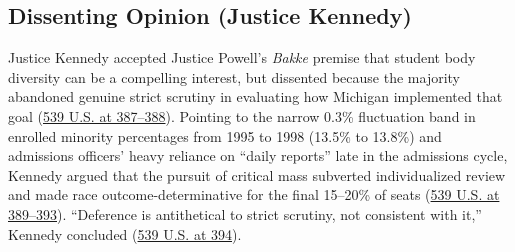 \documentclass[12pt]{article}
\begin{document}
\subsection{Dissenting Opinion (Justice Kennedy)}
Justice Kennedy accepted Justice Powell's \textit{Bakke} premise that student body diversity can be a compelling interest, but dissented because the majority abandoned genuine strict scrutiny in evaluating how Michigan implemented that goal (\href{https://supreme.justia.com/cases/federal/us/539/306/}{539 U.S. at 387--388}). Pointing to the narrow 0.3\% fluctuation band in enrolled minority percentages from 1995 to 1998 (13.5\% to 13.8\%) and admissions officers' heavy reliance on ``daily reports'' late in the admissions cycle, Kennedy argued that the pursuit of critical mass subverted individualized review and made race outcome-determinative for the final 15--20\% of seats (\href{https://supreme.justia.com/cases/federal/us/539/306/}{539 U.S. at 389--393}). ``Deference is antithetical to strict scrutiny, not consistent with it,'' Kennedy concluded (\href{https://supreme.justia.com/cases/federal/us/539/306/}{539 U.S. at 394}).
\end{document}
